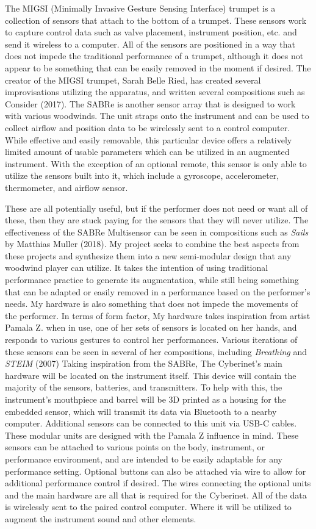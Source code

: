 The MIGSI (Minimally Invasive Gesture Sensing Interface) trumpet is a collection of sensors that attach to the bottom of a trumpet. These sensors work to capture control data such as valve placement, instrument position, etc. and send it wireless to a computer. All of the sensors are positioned in a way that does not impede the traditional performance of a trumpet, although it does not appear to be something that can be easily removed in the moment if desired.
The creator of the MIGSI trumpet, Sarah Belle Ried, has created several improvisations utilizing the apparatus, and written several compositions such as Consider (2017). The SABRe is another sensor array that is designed to work with various woodwinds. The unit straps onto the instrument and can be used to collect airflow and position data to be wirelessly sent to a control computer. While effective and easily removable, this particular device offers a relatively limited amount of usable parameters which can be utilized in an augmented instrument. With the exception of an optional remote, this sensor is only able to utilize the sensors built into it, which include a gyroscope, accelerometer, thermometer, and airflow sensor.

These are all potentially useful, but if the performer does not need or want all of these, then they are stuck paying for the sensors that they will never utilize. The effectiveness of the SABRe Multisensor can be seen in compositions such as \textit{Sails} by Matthias Muller (2018). 
My project seeks to combine the best aspects from these projects and synthesize them into a new semi-modular design that any woodwind player can utilize. It takes the intention of using traditional performance practice to generate its augmentation, while still being something that can be adapted or easily removed in a performance based on the performer’s needs. My hardware is also something that does not impede the movements of the performer. In terms of form factor, My hardware takes inspiration from artist Pamala Z. when in use, one of her sets of sensors is located on her hands, and responds to various gestures to control her performances. Various iterations of these sensors can be seen in several of her compositions, including \textit{Breathing} and \textit{STEIM} (2007)
Taking inspiration from the SABRe, The Cyberinet's main hardware will be located on the instrument itself. This device will contain the majority of the sensors, batteries, and transmitters. To help with this, the instrument’s mouthpiece and barrel will be 3D printed as a housing for the embedded sensor, which will transmit its data via Bluetooth to a nearby computer.
Additional sensors can be connected to this unit via USB-C cables. These modular units are designed with the Pamala Z influence in mind. These sensors can be attached to various points on the body, instrument, or performance environment, and are intended to be easily adaptable for any performance setting.
Optional buttons can also be attached via wire to allow for additional performance control if desired. The wires connecting the optional units and the main hardware are all that is required for the Cyberinet. All of the data is wirelessly sent to the paired control computer. Where it will be utilized to augment the instrument sound and other elements.

